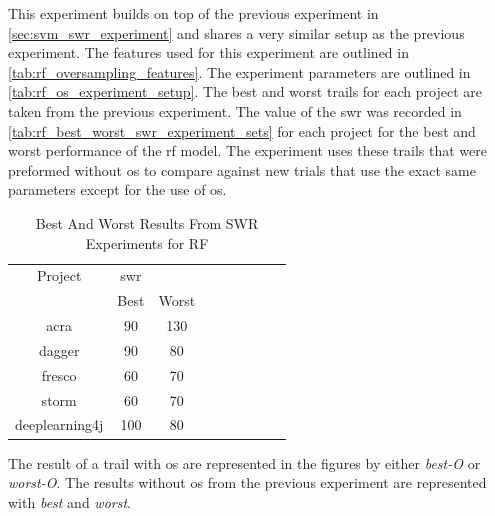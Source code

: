 This experiment builds on top of the previous experiment in \autoref{sec:svm_swr_experiment} and shares a very similar setup as the previous experiment. The features used for this experiment are outlined in \autoref{tab:rf_oversampling_features}. The experiment parameters are outlined in \autoref{tab:rf_os_experiment_setup}. The best and worst trails for each project are taken from the previous experiment. The value of the \gls{swr} was recorded in \autoref{tab:rf_best_worst_swr_experiment_sets} for each project for the best and worst performance of the \gls{rf} model. The experiment uses these trails that were preformed without \gls{os} to compare against new trials that use the exact same parameters except for the use of \gls{os}.

\begin{table}[ht]
\begin{center}

    \begin{tabular}{|c|c|c|c|c|c|c|c|c|}
        \hline
        Project & \multicolumn{1}{c}{\gls{swr}} & \\
         & \multicolumn{1}{c}{Best} & \multicolumn{1}{c|}{Worst} \\
         \hline
        acra & 90 & 130 \\
        dagger & 90 & 80 \\
        fresco & 60 & 70 \\
        storm & 60 & 70 \\
        deeplearning4j & 100 & 80 \\ \hline
    \end{tabular}
    \caption{Best And Worst Results From SWR Experiments for RF}
    \label{tab:rf_best_worst_swr_experiment_sets}
\end{center}
\end{table}

The result of a trail with \gls{os} are represented in the figures by either \textit{best-O} or \textit{worst-O}. The results without \gls{os} from the previous experiment are represented with \textit{best} and \textit{worst}.

